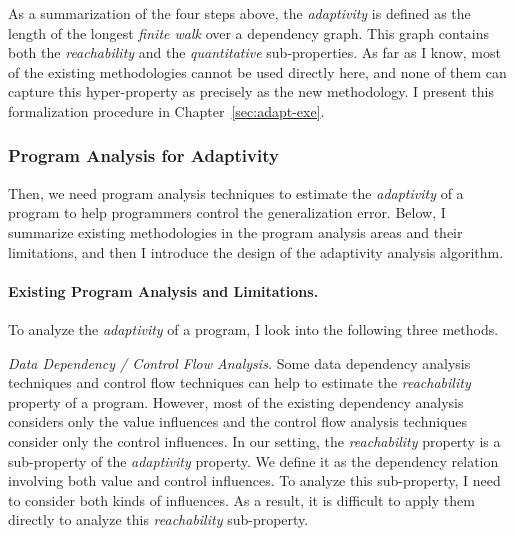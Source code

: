 As a summarization of the four steps above, the \emph{adaptivity} is defined as the length of the longest \emph{finite walk} over a dependency graph. This graph contains both
the \emph{reachability} and the \emph{quantitative} sub-properties.
As far as I know, most of the existing methodologies cannot be used directly here, and none of them can capture this hyper-property as precisely as the new methodology.
I present this formalization procedure in Chapter~\ref{sec:adapt-exe}.


\subsubsection{Program Analysis for Adaptivity}
\label{sec:intro-methodology-adapt-static}
Then, we need program analysis techniques to estimate the \emph{adaptivity} of a program to help programmers control the generalization error.
Below, I summarize existing
methodologies in the program analysis areas and their limitations,
and then I introduce the design of the adaptivity analysis algorithm.

\paragraph{Existing Program Analysis and Limitations.}
To analyze the \emph{adaptivity} of a program, I look into the following three methods.


\emph{Data Dependency / Control Flow Analysis.}
Some data dependency analysis techniques and control flow techniques can
help to estimate the \emph{reachability} property of a program.
However, 
most of the existing dependency analysis considers only the value influences
and the control flow analysis techniques consider only the control influences.
In our setting, the \emph{reachability} property is a sub-property of the \emph{adaptivity} property.
We
define it as the dependency relation
involving both value and control influences.
To analyze this sub-property,
I need to consider both kinds of influences.
As a result, it is difficult to apply them directly to analyze this \emph{reachability} sub-property.

